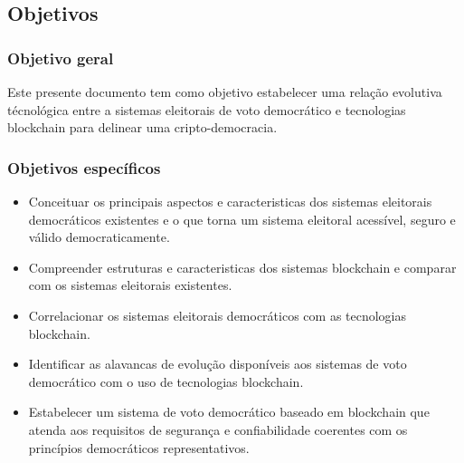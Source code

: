 \subsection{Objetivos}
\subsubsection{Objetivo geral}
Este presente documento tem como objetivo estabelecer uma relação evolutiva 
técnológica entre a sistemas eleitorais de voto democrático e tecnologias blockchain
para delinear uma cripto-democracia.
\subsubsection{Objetivos específicos}
\begin{itemize}
  \item Conceituar os principais aspectos e caracteristicas dos sistemas eleitorais democráticos
  existentes e o que torna um sistema eleitoral acessível, seguro e válido democraticamente.
  \item Compreender estruturas e caracteristicas dos sistemas blockchain e comparar com os sistemas
  eleitorais existentes.
  \item Correlacionar os sistemas eleitorais democráticos com as tecnologias blockchain.
  \item Identificar as alavancas de evolução disponíveis aos sistemas de voto democrático 
  com o uso de tecnologias blockchain.
  \item Estabelecer um sistema de voto democrático baseado em blockchain que atenda
  aos requisitos de segurança e confiabilidade coerentes com os princípios 
  democráticos representativos.
\end{itemize}
\clearpage
